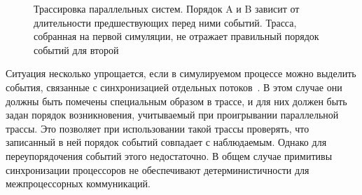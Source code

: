 \begin{figure}[htp]
    \centering
    \caption[Трассировка параллельных систем]{Трассировка параллельных систем. Порядок A и B зависит от длительности предшествующих перед ними событий. Трасса, собранная на первой симуляции, не отражает правильный порядок событий для второй}
    \label{fig:trace-parallel}
\end{figure}

Ситуация несколько упрощается, если в симулируемом процессе можно выделить события, связанные с синхронизацией отдельных потоков~\cite{DBLP:conf/ispass/RicoDCERV11}. В этом случае они должны быть помечены специальным образом в трассе, и для них должен быть задан порядок возникновения, учитываемый при проигрывании параллельной трассы. Это позволяет при использовании такой трассы проверять, что записанный в ней порядок событий совпадает с наблюдаемым. Однако для переупорядочения событий этого недостаточно. В общем случае примитивы синхронизации процессоров не обеспечивают детерминистичности для межпроцессорных коммуникаций.

